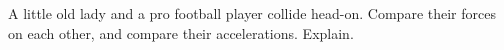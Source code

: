  A little old lady and a pro football player collide
head-on. Compare their forces on each other, and compare
their accelerations. Explain.

